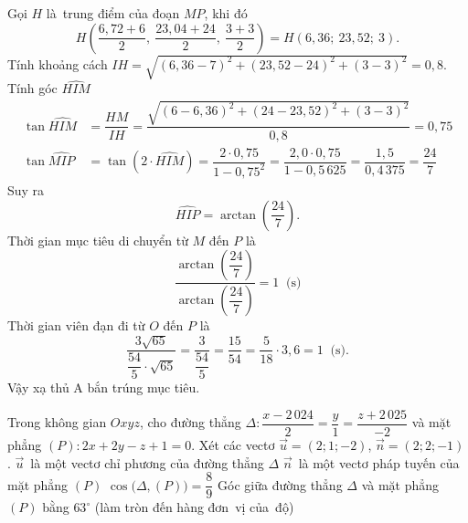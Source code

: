 \begin{ex}
{\begin{itemchoice}
			Gọi  $H$ là~trung điểm của đoạn $MP$, khi đó
			 $$
			H\left( \dfrac{6{,}72 + 6}{2},\ \dfrac{23{,}04 +  24}{2},\ \dfrac{3 + 3}{2} \right) = H(6{,}36;\ 23{,}52;\ 3).
			$$ 
			Tính khoảng cách $IH = \sqrt{(6{,}36 - 7)^2 + (23{,}52 - 24)^2 + (3 -  3)^2} = 0{,}8$.\\
			Tính góc  $\widehat{HIM}$
			\begin{align*}
				\tan \widehat{HIM} &= \dfrac{HM}{IH} = \dfrac{\sqrt{(6 - 6{,}36)^2 + (24 - 23{,}52)^2 + (3 - 3)^2}}{0{,}8} =  0{,}75 \\
				\tan \widehat{MIP} &= \tan(2 \cdot \widehat{HIM}) = \dfrac{2 \cdot 0{,}75}{1 - 0{,}75^2} =  \dfrac{2{,}0 \cdot 0{,}75}{1 - 0{,}5\,625} = \dfrac{1{,}5}{0{,}4\,375} = \dfrac{24}{7}
			\end{align*}
			Suy ra 
			 $$
			\widehat{HIP}  = \arctan\left(\dfrac{24}{7}\right).
			 $$
			Thời gian mục tiêu di  chuyển từ $M$ đến $P$ là
			$$ 
			 \dfrac{\arctan\left(\dfrac{24}{7}\right)}{\arctan\left(\dfrac{24}{7}\right)} = 1\ \text{ (s)}
			 $$
			Thời gian viên đạn đi từ $O$ đến $P$ là 
			 $$
			\dfrac{3\sqrt{65}}{\dfrac{54}{5} \cdot \sqrt{65}} = \dfrac{3}{\dfrac{54}{5}} = \dfrac{15}{54} = \dfrac{5}{18} \cdot 3{,}6  = 1\ \text{ (s)}.
			 $$
			Vậy xạ thủ A  bắn trúng mục tiêu.
		\end{itemchoice}
	 }
\end{ex}

\begin{ex}%
	Trong  không gian $Oxyz$, cho đường thẳng $\Delta\colon\dfrac{x-2\,024}{2}=\dfrac{y}{1}=\dfrac{z+2\,025}{-2}$
	và mặt phẳng $(P)\colon 2x+2y-z+1=0$.  Xét các vectơ $\overrightarrow{u}=(2;1;-2)$, $\overrightarrow{n}=(2;2;-1)$.
	\choiceTF 
		 {\True $\overrightarrow{u}$~là một vectơ chỉ phương của đường thẳng $\Delta$}
		{\True $\overrightarrow{n}$~là một vectơ pháp tuyến của mặt phẳng $(P)$} 
		 {$\cos\big(\Delta,(P)\big)=\dfrac{8}{9}$}
		{\True Góc giữa đường thẳng $\Delta$ và mặt phẳng $(P)$ bằng $63^\circ$ (làm tròn đến  hàng đơn~vị của~độ)}
\end{ex}

